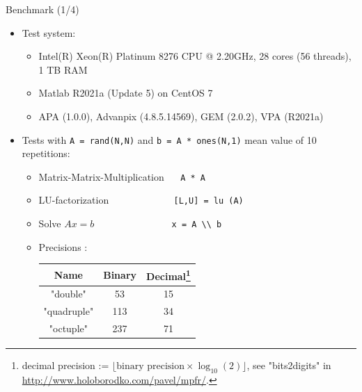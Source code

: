 \begin{frame}{Benchmark (1/4)}

\begin{itemize}\itemsep1em
\item
Test system:
\begin{itemize}
\item
Intel(R) Xeon(R) Platinum 8276 CPU @ 2.20GHz,
28 cores (56 threads),
1 TB RAM

\item
Matlab R2021a (Update 5) on CentOS 7 \\[0.5em]

\item
{\color{blue}
APA (1.0.0), Advanpix (4.8.5.14569), GEM (2.0.2), VPA (R2021a)}
\end{itemize}

\item
Tests with \lstinline|A = rand(N,N)| and \lstinline|b = A * ones(N,1)|
mean value of 10 repetitions:

\begin{itemize}
\item
Matrix-Matrix-Multiplication
$\quad$
\lstinline|A * A|

\item
LU-factorization
$\qquad\qquad\qquad$
\lstinline|[L,U] = lu (A)|

\item
Solve $Ax = b$
$\qquad\qquad\qquad\quad\;$
\lstinline|x = A \\ b|\\[0.5em]

\item
Precisions \cite[Chapter 3.1]{Muller2018}:

\begin{tabular}{|c|c|c|}
\hline
Name & Binary & Decimal\footnote{\scriptsize decimal precision
:= $\lfloor \text{binary precision} \times \log_{10}(2) \rfloor$,
see "bits2digits" in \url{http://www.holoborodko.com/pavel/mpfr/}.} \\
\hline\hline
"double"    &  53 & 15 \\
"quadruple" & 113 & 34 \\
"octuple"   & 237 & 71 \\
\hline
\end{tabular}

\end{itemize}

\end{itemize}

\end{frame}


